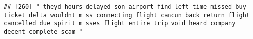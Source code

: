 \documentclass[
]{article}
\begin{document}
\begin{verbatim}
## [260] " theyd hours delayed son airport find left time missed buy ticket delta wouldnt miss connecting flight cancun back return flight cancelled due spirit misses flight entire trip void heard company decent complete scam "                                                                                                                                                                                                                                                                                                                                                                                                                                                                                                                                                                                                                                                                                                                                                                                                                                                                                                                                                                                                                                                                                                                                                                                                                                                                                                                                                                                                                                                                                                                                                                      

\end{verbatim}
\end{document}
